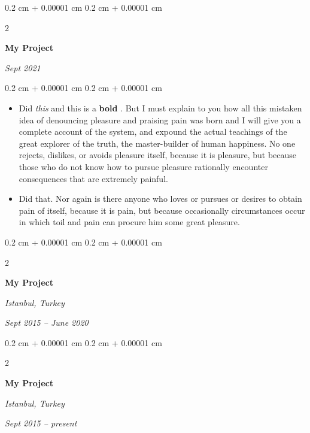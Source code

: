 \documentclass[10pt, letterpaper]{article}
\newenvironment{highlights}{
    \begin{itemize}[
        topsep=0.10 cm,
        parsep=0.10 cm,
        partopsep=0pt,
        itemsep=0pt,
        leftmargin=0.4 cm + 10pt
    ]
}{
    \end{itemize}
} %
\newenvironment{onecolentry}{
    \begin{adjustwidth}{
        0.2 cm + 0.00001 cm
    }{
        0.2 cm + 0.00001 cm
    }
}{
    \end{adjustwidth}
} %
\newenvironment{twocolentry}[2][]{
    \onecolentry
    \def\secondColumn{#2}
    \setcolumnwidth{\fill, 4.5 cm}
    \begin{paracol}{2}
}{
    \switchcolumn \raggedleft \secondColumn
    \end{paracol}
    \endonecolentry
} %
\let\hrefWithoutArrow\href
\renewcommand{\href}[2]{\hrefWithoutArrow{#1}{\ifthenelse{\equal{#2}{}}{ }{#2 }\raisebox{.15ex}{\footnotesize \faExternalLink*}}}
\begin{document}
        \vspace{0.2 cm}

        \begin{twocolentry}{
            
            
        \textit{Sept 2021}}
            \textbf{My Project}
        \end{twocolentry}

        \vspace{0.10 cm}
        \begin{onecolentry}
            \begin{highlights}
                \item Did \textit{this} and this is a \textbf{bold} \href{https://example.com}{link}. But I must explain to you how all this mistaken idea of denouncing pleasure and praising pain was born and I will give you a complete account of the system, and expound the actual teachings of the great explorer of the truth, the master-builder of human happiness. No one rejects, dislikes, or avoids pleasure itself, because it is pleasure, but because those who do not know how to pursue pleasure rationally encounter consequences that are extremely painful.
                \item Did that. Nor again is there anyone who loves or pursues or desires to obtain pain of itself, because it is pain, but because occasionally circumstances occur in which toil and pain can procure him some great pleasure.
            \end{highlights}
        \end{onecolentry}


        \vspace{0.2 cm}

        \begin{twocolentry}{
        \textit{Istanbul, Turkey}    
            
        \textit{Sept 2015 – June 2020}}
            \textbf{My Project}
        \end{twocolentry}



        \vspace{0.2 cm}

        \begin{twocolentry}{
        \textit{Istanbul, Turkey}    
            
        \textit{Sept 2015 – present}}
            \textbf{My Project}
        \end{twocolentry}
\end{document}
